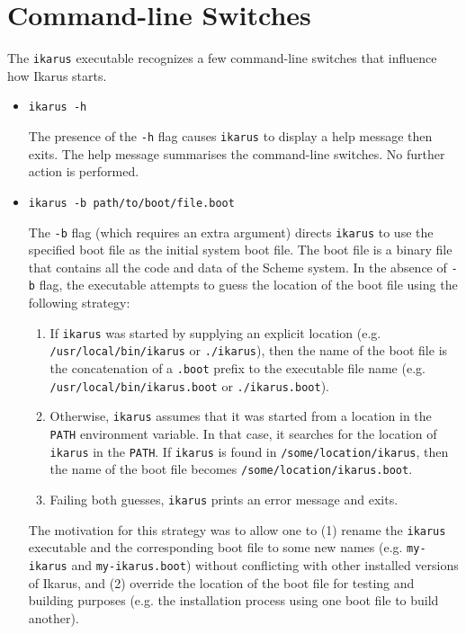 \documentclass[onecolumn, 12pt, twoside, openright, dvipdfm]{book}
\begin{document}
\newpage

\section{Command-line Switches}

The \texttt{ikarus} executable recognizes a few command-line
switches that influence how Ikarus starts.

\begin{itemize}

\item \texttt{ikarus -h}

The presence of the \texttt{-h} flag causes \texttt{ikarus} to
display a help message then exits.  The help message summarises the
command-line switches.  No further action is performed.

\item \texttt{ikarus -b path/to/boot/file.boot}

The \texttt{-b} flag (which requires an extra argument) directs
\texttt{ikarus} to use the specified boot file as the initial system
boot file.   The boot file is a binary file that
contains all the code and data of the Scheme system.  In the absence
of \texttt{-b} flag, the executable attempts to guess the location
of the boot file using the following strategy:
\begin{enumerate}

\item If \texttt{ikarus} was started by supplying an explicit
location (e.g. \texttt{/usr/local/bin/ikarus} or \texttt{./ikarus}),
then the name of the boot file is the concatenation of a
\texttt{.boot} prefix to the executable file name (e.g.
\texttt{/usr/local/bin/ikarus.boot} or \texttt{./ikarus.boot}).

\item Otherwise, \texttt{ikarus} assumes that it was started from a
location in the \texttt{PATH} environment variable.  In that case,
it searches for the location of \texttt{ikarus} in the
\texttt{PATH}.  If \texttt{ikarus} is found in
\texttt{/some/location/ikarus}, then the name of the boot file
becomes \texttt{/some/location/ikarus.boot}.

\item Failing both guesses, \texttt{ikarus} prints an error message
and exits.

\end{enumerate}

The motivation for this strategy was to allow one to (1) rename the
\texttt{ikarus} executable and the corresponding boot file to some
new names (e.g. \texttt{my-ikarus} and \texttt{my-ikarus.boot}) without
conflicting with other installed versions of Ikarus, and (2)
override the location of the boot file for testing and building
purposes (e.g. the installation process using one boot file to build
another).


\end{itemize}
\end{document}
